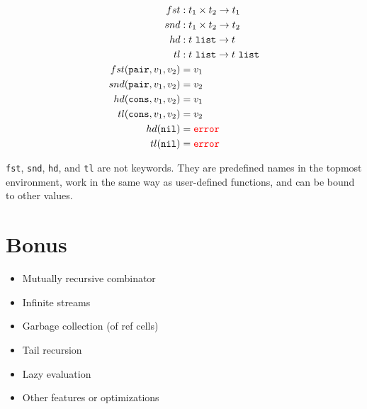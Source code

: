 \documentclass{article}
\begin{document}
\begin{align*}
  fst &: t_1\times t_2\to t_1 \\
  snd &: t_1\times t_2\to t_2 \\
  hd &: t\ \texttt{list}\to t \\
  tl &: t\ \texttt{list}\to t\ \texttt{list} \\
  fst(\texttt{pair},v_1,v_2) &= v_1 \\
  snd(\texttt{pair},v_1,v_2) &= v_2 \\
  hd(\texttt{cons},v_1,v_2) &= v_1 \\
  tl(\texttt{cons},v_1,v_2) &= v_2 \\
  hd(\texttt{nil}) &= \textcolor{red}{\tt error} \\
  tl(\texttt{nil}) &= \textcolor{red}{\tt error}
\end{align*}

\texttt{fst}, \texttt{snd}, \texttt{hd}, and \texttt{tl} are not keywords.
They are predefined names in the topmost environment, work in the same way as user-defined functions, and can be bound to other values.

\section{Bonus}

\begin{itemize}
  \item Mutually recursive combinator
  \item Infinite streams
  \item Garbage collection (of ref cells)
  \item Tail recursion
  \item Lazy evaluation
  \item Other features or optimizations
\end{itemize}
\end{document}

